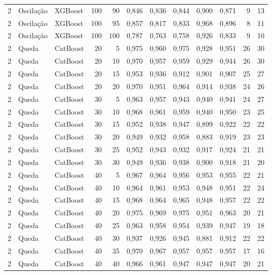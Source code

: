 \begin{longtable}{@{}rllrrrrrrrrr@{}}
2 & Oscilação & XGBoost & 100 & 90 & 0,846 & 0,836 & 0,844 & 0,900 & 0,871 & 9 & 13 \\
2 & Oscilação & XGBoost & 100 & 95 & 0,857 & 0,817 & 0,833 & 0,968 & 0,896 & 8 & 11 \\
2 & Oscilação & XGBoost & 100 & 100 & 0,787 & 0,763 & 0,758 & 0,926 & 0,833 & 9 & 10 \\
2 & Queda & CatBoost & 20 & 5 & 0,975 & 0,960 & 0,975 & 0,928 & 0,951 & 26 & 30 \\
2 & Queda & CatBoost & 20 & 10 & 0,970 & 0,957 & 0,959 & 0,929 & 0,944 & 26 & 30 \\
2 & Queda & CatBoost & 20 & 15 & 0,953 & 0,936 & 0,912 & 0,901 & 0,907 & 25 & 27 \\
2 & Queda & CatBoost & 20 & 20 & 0,970 & 0,951 & 0,964 & 0,914 & 0,938 & 24 & 26 \\
2 & Queda & CatBoost & 30 & 5 & 0,963 & 0,957 & 0,943 & 0,940 & 0,941 & 24 & 27 \\
2 & Queda & CatBoost & 30 & 10 & 0,968 & 0,961 & 0,959 & 0,940 & 0,950 & 23 & 25 \\
2 & Queda & CatBoost & 30 & 15 & 0,952 & 0,938 & 0,947 & 0,899 & 0,922 & 22 & 22 \\
2 & Queda & CatBoost & 30 & 20 & 0,949 & 0,932 & 0,958 & 0,883 & 0,919 & 23 & 23 \\
2 & Queda & CatBoost & 30 & 25 & 0,952 & 0,943 & 0,932 & 0,917 & 0,924 & 21 & 21 \\
2 & Queda & CatBoost & 30 & 30 & 0,949 & 0,936 & 0,938 & 0,900 & 0,918 & 21 & 20 \\
2 & Queda & CatBoost & 40 & 5 & 0,967 & 0,964 & 0,956 & 0,953 & 0,955 & 22 & 21 \\
2 & Queda & CatBoost & 40 & 10 & 0,964 & 0,961 & 0,953 & 0,948 & 0,951 & 22 & 24 \\
2 & Queda & CatBoost & 40 & 15 & 0,968 & 0,964 & 0,965 & 0,948 & 0,957 & 22 & 22 \\
2 & Queda & CatBoost & 40 & 20 & 0,975 & 0,969 & 0,975 & 0,951 & 0,963 & 20 & 21 \\
2 & Queda & CatBoost & 40 & 25 & 0,963 & 0,958 & 0,954 & 0,939 & 0,947 & 19 & 18 \\
2 & Queda & CatBoost & 40 & 30 & 0,937 & 0,926 & 0,945 & 0,881 & 0,912 & 22 & 22 \\
2 & Queda & CatBoost & 40 & 35 & 0,970 & 0,967 & 0,957 & 0,957 & 0,957 & 17 & 16 \\
2 & Queda & CatBoost & 40 & 40 & 0,966 & 0,961 & 0,947 & 0,947 & 0,947 & 20 & 21 \\

\end{longtable}
